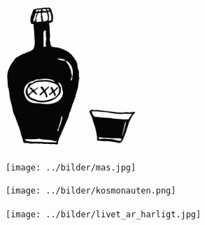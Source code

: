 %

\sclearpage
{}
\begin{figure}[!b]
\begin{center}
\includegraphics[width=5cm]{../bilder/fardigabilder/BilderTillKapitel/brannvin.png} 
\end{center}
\end{figure}
\sclearpage

\sclearpage



\sclearpage


\sclearpage


%
\sclearpage

\begin{figure}[!b]
\begin{center}
\texttt{[image: ../bilder/mas.jpg]} 
\end{center}
\end{figure}
\sclearpage

\sclearpage

\sclearpage

\sclearpage

\sclearpage

\sclearpage


%
\sclearpage


\sclearpage


\sclearpage

\sclearpage

\begin{figure}[!t]
\begin{center}
\texttt{[image: ../bilder/kosmonauten.png]} 
\end{center}
\end{figure}
\vspace{25mm}

\begin{figure}[!b]
\begin{center}
\texttt{[image: ../bilder/livet\_ar\_harligt.jpg]} 
\end{center}
\end{figure}
